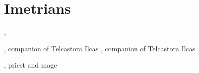 \section{Imetrians}
\begin{dramatispersonae}
    {\scatha}{\male}, 
  \begin{subdramatispersonae}
    \nycan\female, companion of Telcastora Ilcas
    \nycan\male, companion of Telcastora Ilcas
  \end{subdramatispersonae}
  , 
    priest and mage
\end{dramatispersonae}



